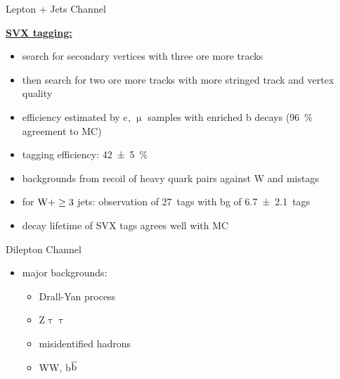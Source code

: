 \begin{frame}{Lepton + Jets Channel}
	
	\underline{\textbf{SVX tagging:}}\vspace*{5pt}
	\begin{itemize}\itemfill 
		\item search for secondary vertices with three ore more tracks
		\item then search for two ore more tracks with more stringed track and vertex quality
		\item efficiency estimated by $e$, $\upmu$ samples with enriched b decays (\SI{96}{\%} agreement to MC)
		\item tagging efficiency: \SI{42\pm5}{\%}
	\end{itemize}
	
	\begin{minipage}[c][.30\textheight]{.64\textwidth}
	 	\begin{itemize}\itemfill
			\item backgrounds from recoil of heavy quark pairs against W and mistags
	 	 	\item for $\text{W}+\ge3$ jets: observation of \SI{27}{tags} with bg of \SI{6.7\pm2.1}{tags}
	 	 	\item decay lifetime of SVX tags agrees well with MC
	 	\end{itemize}
	\end{minipage}
	\begin{minipage}{.33\textwidth}
	\end{minipage}

\end{frame}
\begin{frame}{Dilepton Channel}
	
	\begin{minipage}[c][.30\textheight]{.64\textwidth}
		\begin{itemize}\itemfill 
			\item major backgrounds:
			\begin{itemize}
				\item Drall-Yan process
				\item Z\ch{->}$\uptau\uptau$
				\item misidentified hadrons
				\item WW, b$\overline{\text{b}}$
			\end{itemize}
		\end{itemize}
	\end{minipage}
	\begin{minipage}{.33\textwidth}
	\end{minipage}

\end{frame}
